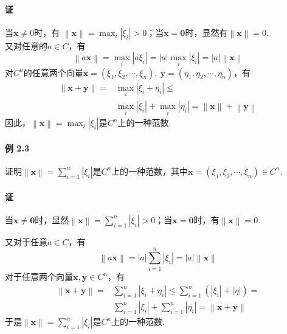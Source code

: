 \documentclass[12pt, a4paper, oneside, fontset=none]{ctexart}
\begin{document}
\paragraph*{证} 当$\bm{x} \neq 0$时，有 $\left\lVert \bm{x} \right\rVert = \max_i\left\lvert \xi_i \right\rvert > 0$；当$\bm{x} = \bm{0}$时，显然有$\left\lVert \bm{x} \right\rVert = 0$. \\
又对任意的$a\in C$，有
\[
    \left\lVert a\bm{x} \right\rVert = \max_i\left\lvert a\xi_i \right\rvert = \left\lvert a \right\rvert \max_i \left\lvert \xi_i \right\rvert = \left\lvert a \right\rvert \left\lVert \bm{x} \right\rVert
\]
对$C^n$的任意两个向量$\bm{x} = (\xi_1,\xi_2,\cdots,\xi_n),\ \bm{y} = (\eta_1,\eta_2,\cdots,\eta_n)$，有
\begin{align*}
    \left\lVert \bm{x} + \bm{y} \right\rVert = & \max_i \left\lvert \xi_i + \eta_i \right\rvert \leqslant                                                                                          \\
                                               & \max_i \left\lvert \xi_i \right\rvert + \max_i\left\lvert \eta_i \right\rvert = \left\lVert \bm{x} \right\rVert + \left\lVert \bm{y} \right\rVert
\end{align*}
因此，$\left\lVert \bm{x}\right\rVert = \max_i \left\lvert \xi_i \right\rvert $是$C^n$上的一种范数.

\paragraph*{例 2.3} 证明$\left\lVert \bm{x}\right\rVert = \sum_{i=1}^n\left\lvert \xi_i \right\rvert $是$C^n$上的一种范数，其中$\bm{x} = (\xi_1,\xi_2,\cdots,\xi_n) \in C^n$.

\paragraph*{证} 当$\bm{x} \neq \bm{0}$时，显然$\left\lVert \bm{x} \right\rVert = \sum_{i=1}^n \left\lvert \xi_i \right\rvert > 0$；当$\bm{x} = \bm{0}$时，有$\left\lVert \bm{x} \right\rVert = 0$.\par
又对于任意$a\in C$，有
\[
    \left\lVert a\bm{x} \right\rVert = \left\lvert a \right\rvert \sum_{i=1}^n\left\lvert \xi_i \right\rvert = \left\lvert a \right\rvert \left\lVert \bm{x}\right\rVert
\]
对于任意两个向量$\bm{x},\bm{y}\in C^n$，有
\begin{align*}
    \left\lVert \bm{x} + \bm{y} \right\rVert = & \sum_{i=1}^n\left\lvert \xi_i + \eta_i \right\rvert \leqslant \sum_{i=1}^n(\left\lvert \xi_i \right\rvert + \left\lvert \eta \right\rvert ) = \\
                                               & \sum_{i=1}^n\left\lvert \xi_i \right\rvert + \sum_{i=1}^n\left\lvert \eta_i \right\rvert = \left\lVert \bm{x} + \bm{y} \right\rVert
\end{align*}
于是$\left\lVert \bm{x} \right\rVert = \sum_{i=1}^n \left\lvert \xi_i \right\rvert $是$C^n$上的一种范数.
\end{document}

